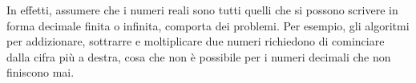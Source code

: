 In effetti, assumere che i numeri reali sono tutti quelli che si possono 
scrivere in forma decimale finita o infinita,  comporta dei problemi. 
Per esempio, gli algoritmi per addizionare, 
sottrarre e moltiplicare due numeri richiedono di cominciare dalla cifra 
più a destra, cosa che non è possibile per i numeri decimali che non 
finiscono mai. 

\begin{comment}
È possibile costruire l'insieme dei numeri reali a 
partire dall'insieme dei numeri razionali dividendoli in due insiemi~\(A\) 
e~\(B\) 
con particolari caratteristiche:
\begin{enumerate*}
 \item \(A \cap B=\emptyset\)
 \item \(A \cup B=\Q\)
 \item \(\forall a \in A, \forall b \in B, a<b\)
\end{enumerate*}

Una coppia di insiemi con queste caratteristiche venne chiamato da 
Dedekind~(1831-1916) una \emph{sezione}, o \emph{partizione} di \(\Q\).

Dato che \(A\) e \(B\) devono avere intersezione nulla:

\begin{itemize*}
 \item se \(A\) ha un massimo \(B\) non può avere un minimo;
 \item se \(A\) non ha un massimo \(B\) può avere un minimo;
 \item \(A\) può non avere un massimo \(B\) può non avere un minimo;
\end{itemize*}



\end{comment}
